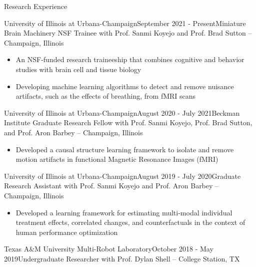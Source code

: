 \documentclass{resume} %
\begin{document}

\begin{rSection}{Research Experience}
\begin{rSubsection}{University of Illinois at Urbana-Champaign}{September 2021 - Present}{Miniature Brain Machinery NSF Trainee with Prof. Sanmi Koyejo and Prof. Brad Sutton -- Champaign, Illinois} 

\begin{itemize}
    \setlength\itemsep{0em}
    \item An NSF-funded research traineeship that combines cognitive and behavior studies with brain cell and tissue biology
    \item Developing machine learning algorithms to detect and remove nuisance artifacts, such as the effects of breathing, from fMRI scans
\end{itemize}
\end{rSubsection}
\begin{rSubsection}{University of Illinois at Urbana-Champaign}{August 2020 - July 2021}{Beckman Institute Graduate Research Fellow with Prof. Sanmi Koyejo, Prof. Brad Sutton, and Prof. Aron Barbey -- Champaign, Illinois} 

\begin{itemize}
    \setlength\itemsep{0em}
    \item Developed a causal structure learning framework to isolate and remove motion artifacts in functional Magnetic Resonance Images (fMRI)
\end{itemize}
\end{rSubsection}
\begin{rSubsection}{University of Illinois at Urbana-Champaign}{August 2019 - July 2020}{Graduate Research Assistant with Prof. Sanmi Koyejo and Prof. Aron Barbey -- Champaign, Illinois} 

\begin{itemize}
    \setlength\itemsep{0em}
    \item Developed a learning framework for estimating multi-modal individual treatment effects, correlated changes, and counterfactuals in the context of human performance optimization
\end{itemize}
\end{rSubsection}
\begin{rSubsection}{Texas A\&M University Multi-Robot Laboratory}{October 2018 - May 2019}{Undergraduate Researcher with Prof. Dylan Shell -- College Station, TX}


\end{rSubsection}
\end{rSection}
\end{document}
